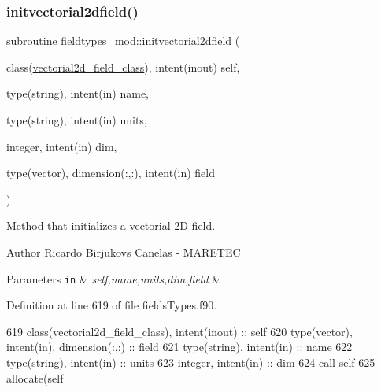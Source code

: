 \subsubsection{\texorpdfstring{initvectorial2dfield()}{initvectorial2dfield()}}
{\footnotesize\ttfamily subroutine fieldtypes\+\_\+mod\+::initvectorial2dfield (\begin{DoxyParamCaption}\item[{class(\mbox{\hyperlink{structfieldtypes__mod_1_1vectorial2d__field__class}{vectorial2d\+\_\+field\+\_\+class}}), intent(inout)}]{self,  }\item[{type(string), intent(in)}]{name,  }\item[{type(string), intent(in)}]{units,  }\item[{integer, intent(in)}]{dim,  }\item[{type(vector), dimension(\+:,\+:), intent(in)}]{field }\end{DoxyParamCaption})\hspace{0.3cm}{\ttfamily [private]}}



Method that initializes a vectorial 2D field. 

\begin{DoxyAuthor}{Author}
Ricardo Birjukovs Canelas -\/ M\+A\+R\+E\+T\+EC 
\end{DoxyAuthor}

\begin{DoxyParams}[1]{Parameters}
\mbox{\tt in}  & {\em self,name,units,dim,field} & \\
\hline
\end{DoxyParams}


Definition at line 619 of file fields\+Types.\+f90.


\begin{DoxyCode}
619     \textcolor{keywordtype}{class}(vectorial2d\_field\_class), \textcolor{keywordtype}{intent(inout)} :: self
620     \textcolor{keywordtype}{type}(vector), \textcolor{keywordtype}{intent(in)}, \textcolor{keywordtype}{dimension(:,:)} :: field
621     \textcolor{keywordtype}{type}(string), \textcolor{keywordtype}{intent(in)} :: name
622     \textcolor{keywordtype}{type}(string), \textcolor{keywordtype}{intent(in)} :: units
623     \textcolor{keywordtype}{integer}, \textcolor{keywordtype}{intent(in)} :: dim
624     \textcolor{keyword}{call }self%
625     \textcolor{keyword}{allocate}(self%
\end{DoxyCode}
\mbox{\label{namespacefieldtypes__mod_a20d935cfa1513350667d04f969be5e26}} 

